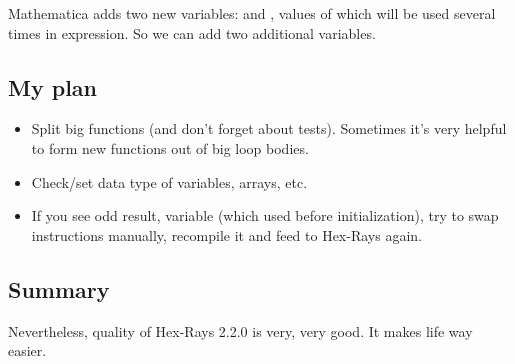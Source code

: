 Mathematica adds two new variables:  and , values of which will be used several times in expression.
So we can add two additional variables.

\subsection{My plan}

\begin{itemize}
\item Split big functions (and don't forget about tests).
Sometimes it's very helpful to form new functions out of big loop bodies.

\item Check/set data type of variables, arrays, etc.

\item If you see odd result,  variable (which used before initialization), try to swap instructions manually,
recompile it and feed to Hex-Rays again.
\end{itemize}

\subsection{Summary}

Nevertheless, quality of Hex-Rays 2.2.0 is very, very good.
It makes life way easier.

